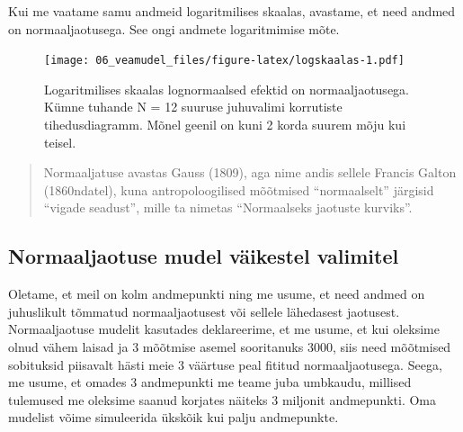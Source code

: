 \documentclass[]{book}
\newenvironment{Shaded}{\begin{snugshade}}{\end{snugshade}}
\newcommand{\KeywordTok}[1]{\textcolor[rgb]{0.13,0.29,0.53}{\textbf{#1}}}
\newcommand{\DataTypeTok}[1]{\textcolor[rgb]{0.13,0.29,0.53}{#1}}
\newcommand{\DecValTok}[1]{\textcolor[rgb]{0.00,0.00,0.81}{#1}}
\newcommand{\StringTok}[1]{\textcolor[rgb]{0.31,0.60,0.02}{#1}}
\newcommand{\OperatorTok}[1]{\textcolor[rgb]{0.81,0.36,0.00}{\textbf{#1}}}
\newcommand{\NormalTok}[1]{#1}
\begin{document}
Kui me vaatame samu andmeid logaritmilises skaalas, avastame, et need
andmed on normaaljaotusega. See ongi andmete logaritmimise mõte.





\begin{Shaded}
\end{Shaded}

\begin{figure}
\centering
\texttt{[image: 06\_veamudel\_files/figure-latex/logskaalas-1.pdf]}
\caption{\label{fig:logskaalas}Logaritmilises skaalas lognormaalsed efektid on
normaaljaotusega. Kümne tuhande N = 12 suuruse juhuvalimi korrutiste
tihedusdiagramm. Mõnel geenil on kuni 2 korda suurem mõju kui teisel.}
\end{figure}

\begin{quote}
Normaaljatuse avastas Gauss (1809), aga nime andis sellele Francis
Galton (1860ndatel), kuna antropoloogilised mõõtmised ``normaalselt''
järgisid ``vigade seadust'', mille ta nimetas ``Normaalseks jaotuste
kurviks''.
\end{quote}

\subsection*{Normaaljaotuse mudel väikestel
valimitel}\label{normaaljaotuse-mudel-vaikestel-valimitel}

Oletame, et meil on kolm andmepunkti ning me usume, et need andmed on
juhuslikult tõmmatud normaaljaotusest või sellele lähedasest jaotusest.
Normaaljaotuse mudelit kasutades deklareerime, et me usume, et kui
oleksime olnud vähem laisad ja 3 mõõtmise asemel sooritanuks 3000, siis
need mõõtmised sobituksid piisavalt hästi meie 3 väärtuse peal fititud
normaaljaotusega. Seega, me usume, et omades 3 andmepunkti me teame juba
umbkaudu, millised tulemused me oleksime saanud korjates näiteks 3
miljonit andmepunkti. Oma mudelist võime simuleerida ükskõik kui palju
andmepunkte.
\end{document}
